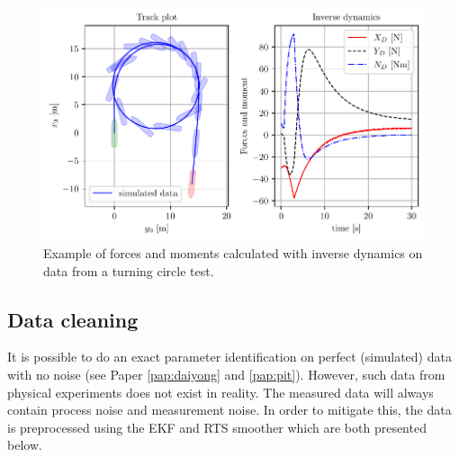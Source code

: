 \begin{figure}[H]
    \centering
    \includegraphics[width=\textwidth]{kappa/images/1.pdf}
    \caption{Example of forces and moments calculated with inverse dynamics on data from a turning circle test.}
    \label{\detokenize{03.01_inverse_dynamics:fig-inverse}}
\end{figure}

\subsection{Data cleaning}
\label{sec:datacleaning}
It is possible to do an exact parameter identification on perfect (simulated) data with no noise (see Paper \ref{pap:daiyong} and \ref{pap:pit}). However, such data from physical experiments does not exist in reality. The measured data will always contain process noise and measurement noise. In order to mitigate this, the data is preprocessed using the EKF and RTS smoother which are both presented below.

